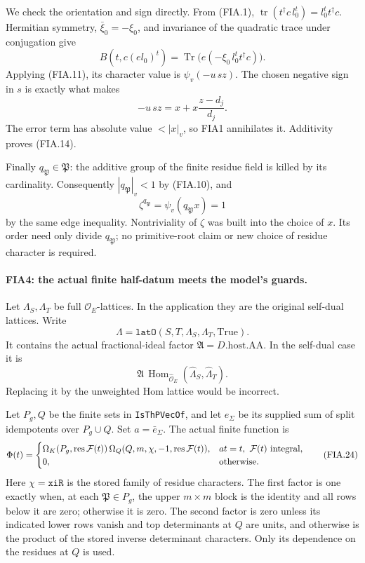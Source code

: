 We check the orientation and sign directly.
From (FIA.1),
\(\operatorname{tr}(t^\dagger c\,l_0^t)
=l_0^t t^\dagger c\).
Hermitian symmetry, \(\bar\xi_0=-\xi_0\), and invariance
of the quadratic trace under conjugation give
\[
 B(t,c(e l_0)^t)
   =\operatorname{Tr}
          \bigl(e(-\xi_0\,l_0^t t^\dagger c)\bigr).
 \tag{FIA.20}
\]
Applying (FIA.11), its character value is
\(\psi_v(-u\,s z)\).  The chosen negative sign in \(s\)
is exactly what makes
\[
             -u\,s z=x+x\frac{z-d_j}{d_j}.
 \tag{FIA.21}
\]
The error term has absolute value \(<|x|_v\), so FIA1
annihilates it.  Additivity proves (FIA.14).

Finally \(q_{\mathfrak P}\in\mathfrak P\): the additive group
of the finite residue field is killed by its cardinality.
Consequently \(|q_{\mathfrak P}|_v<1\) by (FIA.10), and
\[
 \zeta^{q_{\mathfrak P}}
   =\psi_v(q_{\mathfrak P}x)=1
 \tag{FIA.22}
\]
by the same edge inequality.  Nontriviality of \(\zeta\)
was built into the choice of \(x\).
Its order need only divide \(q_{\mathfrak P}\); no primitive-root
claim or new choice of residue character is required.

\paragraph{FIA4: the actual finite half-datum meets the model's guards.}
\label{claim:FIA4}
Let \(\Lambda_S,\Lambda_T\) be full
\(\mathcal O_E\)-lattices.  In the application they are the
original self-dual lattices.  Write
\[
 \Lambda=\texttt{latO}(S,T,\Lambda_S,\Lambda_T,\mathrm{True}).
 \tag{FIA.23}
\]
It contains the actual fractional-ideal factor
\(\mathfrak A=D.\mathrm{host}.\mathrm{AA}\).  In the self-dual
case it is
\[
 \widehat{\mathfrak A}\,
 \operatorname{Hom}_{\widehat{\mathcal O}_E}
  (\widehat\Lambda_S,\widehat\Lambda_T).
\]
Replacing it by the unweighted Hom lattice would be incorrect.

Let \(P_g,Q\) be the finite sets in
\texttt{IsThPVecOf}, and let \(e_\Sigma\) be its supplied
sum of split idempotents over \(P_g\cup Q\).
Set \(a=\bar e_\Sigma\).  The actual finite function is
\[
 \Phi(t)=
 \begin{cases}
 \Omega_K(P_g,\operatorname{res}{\cal F}(t))\,
 \Omega_Q(Q,m,\chi,-1,\operatorname{res}{\cal F}(t)),
       &at=t,\ {\cal F}(t)\text{ integral},\\
 0,&\text{otherwise}.
 \end{cases}                                                     \tag{FIA.24}
\]
Here \(\chi=\texttt{xiR}\) is the stored family of residue
characters.  The first factor is one exactly when, at each
\(\mathfrak P\in P_g\), the upper \(m\times m\) block is the
identity and all rows below it are zero; otherwise it is zero.
The second factor is zero unless its indicated lower rows
vanish and top determinants at \(Q\) are units, and otherwise
is the product of the stored inverse determinant characters.
Only its dependence on the residues at \(Q\) is used.


